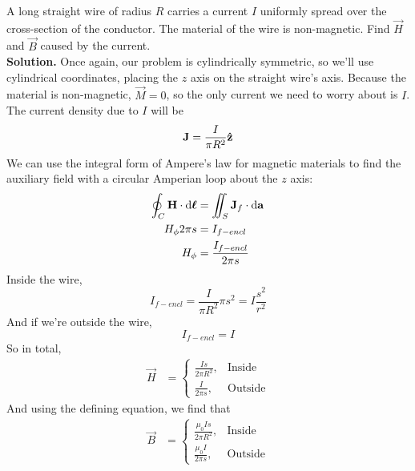 \documentclass[a4paper]{article}
\begin{document}
\begin{eg}
	A long straight wire of radius $R$ carries a current $I$ uniformly
	spread over the cross-section of the conductor. The material of the
	wire is non-magnetic. Find $\vec{H}$ and $\vec{B}$ caused by the
	current.\\
	\textbf{Solution.}
	Once again, our problem is cylindrically symmetric, so we'll use
	cylindrical coordinates, placing the $z$ axis on the straight wire's
	axis. Because the material is non-magnetic, $\vec{M}=0$, so the
	only current we need to worry about is $I$.
	The current density due to $I$ will be
	\[ \boldsymbol{\mathbf{J}} = \frac{I}{\pi R^2}\boldsymbol{\mathbf{\hat{z}}} \]
	We can use the integral form of Ampere's law for magnetic materials
	to find the auxiliary field with a circular Amperian loop about the
	$z$ axis:
	\begin{align*}
		\oint_C\boldsymbol{\mathbf{H}}\cdot\mathrm{d}\boldsymbol{\mathbf{\ell}} &= \iint_S\boldsymbol{\mathbf{J}}_f
		\cdot\mathrm{d}\boldsymbol{\mathbf{a}}\\
		H_\phi2\pi s &= I_{f-encl}\\
		H_\phi &= \frac{I_{f-encl}}{2\pi s}
	\end{align*}
	Inside the wire,
	\[ I_{f-encl} = \frac{I}{\pi R^2}\pi s^2 = I\frac{s^2}{r^2} \]
	And if we're outside the wire,
	\[ I_{f-encl} = I \]
	So in total,
	\begin{align*}
		\vec{H} &= 
	\begin{cases}
		\frac{Is}{2\pi R^2}, & \text{Inside}\\
		\frac{I}{2\pi s}, & \text{Outside}
	\end{cases}
	\end{align*}
	And using the defining equation, we find that
	\begin{align*}
		\vec{B} &= 
	\begin{cases}
		\frac{\mu_0Is}{2\pi R^2}, & \text{Inside}\\
		\frac{\mu_0I}{2\pi s}, & \text{Outside}
	\end{cases}
	\end{align*}
\end{eg}
\end{document}
